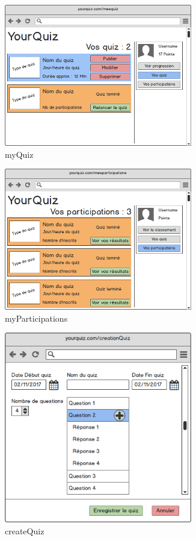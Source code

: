 \documentclass[a4paper, 12pt]{article}
\begin{document}
\begin{figure}
	\begin{center}
		\includegraphics[width=0.73\textwidth]{../mockups/png/myQuiz.png}
        \caption{myQuiz}
	\end{center}
\end{figure}
\begin{figure}
	\begin{center}
		\includegraphics[width=0.73\textwidth]{../mockups/png/myParticipations.png}
        \caption{myParticipations}
	\end{center}
\end{figure}
\begin{figure}
	\begin{center}
		\includegraphics[width=0.73\textwidth]{../mockups/png/createQuiz.png}
        \caption{createQuiz}
	\end{center}
\end{figure}
\end{document}

